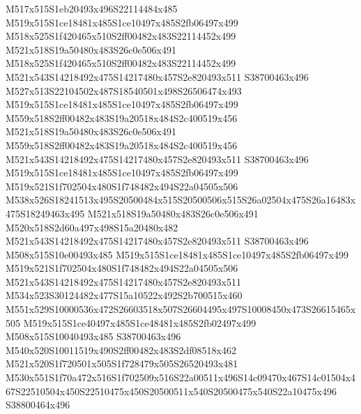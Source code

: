 \documentclass{article}
\begin{document}
\begin{multicols}{2}
M517x515S1eb20493x496S22114484x485 M519x515S1ce18481x485S1ce10497x485S2fb06497x499 M518x525S1f420465x510S2ff00482x483S22114452x499 M521x518S19a50480x483S26c0e506x491 M518x525S1f420465x510S2ff00482x483S22114452x499 M521x543S14218492x475S14217480x457S2e820493x511 S38700463x496 M527x513S22104502x487S18540501x498S26506474x493 M519x515S1ce18481x485S1ce10497x485S2fb06497x499 M559x518S2ff00482x483S19a20518x484S2c400519x456 M521x518S19a50480x483S26c0e506x491 M559x518S2ff00482x483S19a20518x484S2c400519x456 M521x543S14218492x475S14217480x457S2e820493x511 S38700463x496 M519x515S1ce18481x485S1ce10497x485S2fb06497x499 M519x521S1f702504x480S1f748482x494S22a04505x506 M538x526S18241513x495S20500484x515S20500506x515S26a02504x475S26a16483x475S18249463x495 M521x518S19a50480x483S26c0e506x491 M520x518S2d60a497x498S15a20480x482 M521x543S14218492x475S14217480x457S2e820493x511 S38700463x496 M508x515S10e00493x485 M519x515S1ce18481x485S1ce10497x485S2fb06497x499 M519x521S1f702504x480S1f748482x494S22a04505x506 M521x543S14218492x475S14217480x457S2e820493x511 M534x523S30124482x477S15a10522x492S2b700515x460 M551x529S10000536x472S26603518x507S26604495x497S10008450x473S26615465x505 M519x515S1ce40497x485S1ce48481x485S2fb02497x499 M508x515S10040493x485 S38700463x496 M540x520S10011519x490S2ff00482x483S2df08518x462 M521x520S1f720501x505S1f728479x505S26520493x481 M530x551S1f70a472x516S1f702509x516S22a00511x496S14c09470x467S14c01504x467S22510504x450S22510475x450S20500511x540S20500475x540S22a10475x496 S38800464x496









\end{multicols}
\end{document}
